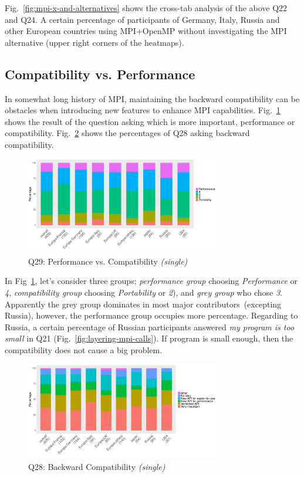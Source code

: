 \documentclass[preprint,5p,times]{elsarticle}
\def\myquote#1{{\it #1}}
\def\mcountries{major contributors}%
\begin{document}
Fig.~\ref{fig:mpi-x-and-alternatives} shows the cross-tab analysis of
the above Q22 and Q24. A certain percentage of participants of
Germany, Italy, Russia and other European countries using MPI+OpenMP
without investigating the MPI alternative (upper right corners of the
heatmaps).

\subsection{Compatibility vs. Performance}

In somewhat long history of MPI, maintaining the backward
compatibility can be obstacles when introducing new features to
enhance MPI capabilities. Fig.~\ref{fig:performance-vs-compatibility}
shows the result of the question asking which is more important,
performance or compatibility. Fig.~\ref{fig:compatibility} shows the
percentages of Q28 asking backward compatibility.

\begin{figure}[htb]
\begin{center}
\includegraphics[width=8.5cm]{R-scripts/Q29.pdf}
\caption{Q29: Performance vs. Compatibility {\it(single)}}
\label{fig:performance-vs-compatibility}
\end{center}
\end{figure}

In Fig~\ref{fig:performance-vs-compatibility}, let's consider three
groups; {\it performance group} choosing \myquote{Performance} or
\myquote{4}, {\it compatibility group} choosing \myquote{Portability} or
\myquote{2}), and {\it grey group} who chose \myquote{3}. Apparently the grey
group dominates in most \mcountries\  (excepting Russia),
however, the performance group occupies more percentage. Regarding to
Russia, a certain percentage of Russian participants answered
\myquote{my program is too small} in Q21
(Fig.~\ref{fig:layering-mpi-calls}). If program is small enough, then
the compatibility does not cause a big problem.

\begin{figure}[htb]
\begin{center}
\includegraphics[width=8.5cm]{R-scripts/Q28.pdf}
\caption{Q28: Backward Compatibility {\it(single)}}
\label{fig:compatibility}
\end{center}
\end{figure}
\end{document}
